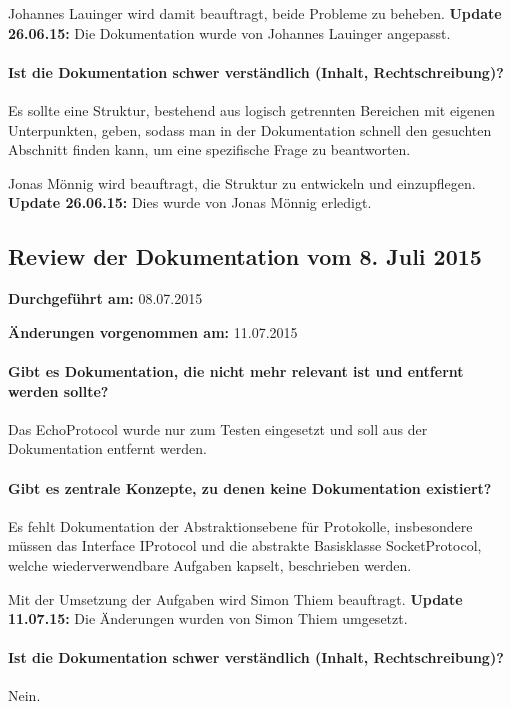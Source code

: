 Johannes Lauinger wird damit beauftragt, beide Probleme zu beheben. \textbf{Update 26.06.15:} Die Dokumentation wurde von Johannes Lauinger angepasst.

\paragraph{Ist die Dokumentation schwer verständlich (Inhalt, Rechtschreibung)?}
Es sollte eine Struktur, bestehend aus logisch getrennten Bereichen mit eigenen Unterpunkten, geben, sodass man in der Dokumentation schnell den gesuchten Abschnitt finden kann, um eine spezifische Frage zu beantworten.

Jonas Mönnig wird beauftragt, die Struktur zu entwickeln und einzupflegen. \textbf{Update 26.06.15:} Dies wurde von Jonas Mönnig erledigt.


\subsection{Review der Dokumentation vom 8. Juli 2015}

\textbf{Durchgeführt am:} 08.07.2015

\textbf{Änderungen vorgenommen am:} 11.07.2015

\paragraph{Gibt es Dokumentation, die nicht mehr relevant ist und entfernt werden sollte?}
Das EchoProtocol wurde nur zum Testen eingesetzt und soll aus der Dokumentation entfernt werden.

\paragraph{Gibt es zentrale Konzepte, zu denen keine Dokumentation existiert?}
Es fehlt Dokumentation der Abstraktionsebene für Protokolle, insbesondere müssen das Interface IProtocol und die abstrakte Basisklasse SocketProtocol, welche wiederverwendbare Aufgaben kapselt, beschrieben werden.

Mit der Umsetzung der Aufgaben wird Simon Thiem beauftragt. \textbf{Update 11.07.15:} Die Änderungen wurden von Simon Thiem umgesetzt.

\paragraph{Ist die Dokumentation schwer verständlich (Inhalt, Rechtschreibung)?}
Nein.


